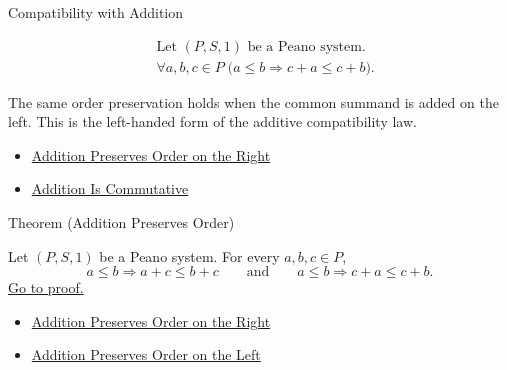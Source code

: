 \begin{topicbox}{Compatibility with Addition}
\begin{remark*}
\[
\begin{aligned}
&\text{Let } (P,S,1) \text{ be a Peano system.}\\
&\forall a,b,c \in P\;
\bigl(a \le b \Longrightarrow c+a \le c+b\bigr).
\end{aligned}
\]
\end{remark*}

\begin{remark*}[Interpretation]
The same order preservation holds when the common summand is added on the
left. This is the left-handed form of the additive compatibility law.
\end{remark*}

\begin{dependencies}
\begin{itemize}
  \item \hyperref[thm:addition-preserves-order-on-right]{Addition Preserves Order on the Right}
  \item \hyperref[thm:addition-commutative]{Addition Is Commutative}
\end{itemize}
\end{dependencies}

\begin{theorembox}{Theorem (Addition Preserves Order)}
\begin{theorem}
\label{thm:addition-preserves-order}
Let $(P,S,1)$ be a Peano system. For every $a,b,c \in P$,
\[
a \le b \Longrightarrow a+c \le b+c
\qquad\text{and}\qquad
a \le b \Longrightarrow c+a \le c+b.
\]
\hyperref[prf:addition-preserves-order]{Go to proof.}
\end{theorem}
\end{theorembox}

\begin{dependencies}
\begin{itemize}
  \item \hyperref[thm:addition-preserves-order-on-right]{Addition Preserves Order on the Right}
  \item \hyperref[thm:addition-preserves-order-on-left]{Addition Preserves Order on the Left}
\end{itemize}
\end{dependencies}
\end{topicbox}

